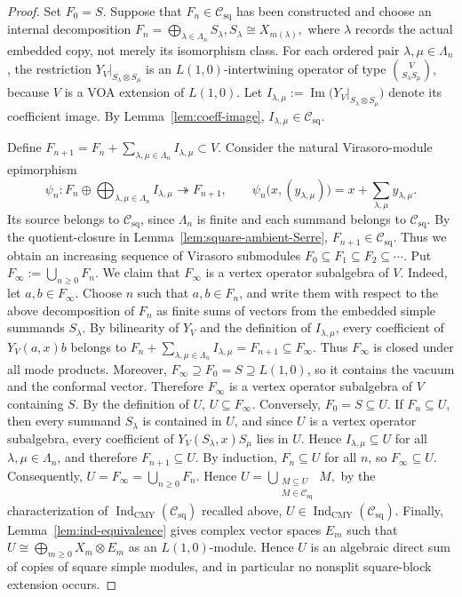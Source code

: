 \documentclass[10pt,a4paper]{amsart}
\numberwithin{equation}{section} \newtheorem{thm}{Theorem}[section] \newtheorem{lem}[thm]{Lemma} \newtheorem{ex}[thm]{Example} \newtheorem{prop}[thm]{Proposition} \newtheorem{cor}[thm]{Corollary} \newtheorem{defi}[thm]{Definition} \newtheorem{rmk}[thm]{Remark} \newtheorem{notation}[thm]{Notation}
\newcommand{\Csq}{\mathcal C_{\mathrm{sq}}}
\newcommand{\IndCMY}{\operatorname{Ind}_{\mathrm{CMY}}}
\begin{document}
\begin{proof}
Set \(F_0=S\). Suppose that \(F_n\in\Csq\) has been constructed and choose an internal decomposition \(F_n=\bigoplus_{\lambda\in\Lambda_n}S_\lambda,S_\lambda\cong X_{m(\lambda)},\) where $\lambda$ records the actual embedded copy, not merely its isomorphism class. For each ordered pair \(\lambda,\mu\in\Lambda_n\), the restriction \(Y_V|_{S_\lambda\otimes S_\mu}\) is an $L(1,0)$-intertwining operator of type \(\binom{V}{S_\lambda S_\mu},\) because $V$ is a VOA extension of $L(1,0)$. Let \(I_{\lambda,\mu}:=\operatorname{Im}\bigl(Y_V|_{S_\lambda\otimes S_\mu}\bigr)\) denote its coefficient image. By Lemma~\ref{lem:coeff-image}, \(I_{\lambda,\mu}\in\Csq\).

Define \(F_{n+1}=F_n+\sum_{\lambda,\mu\in\Lambda_n}I_{\lambda,\mu}\subset V.\) Consider the natural Virasoro-module epimorphism
\[
\psi_n:
F_n\oplus
\bigoplus_{\lambda,\mu\in\Lambda_n}I_{\lambda,\mu}
\twoheadrightarrow F_{n+1},
\qquad
\psi_n\bigl(x,(y_{\lambda,\mu})\bigr)
=
x+\sum_{\lambda,\mu}y_{\lambda,\mu}.
\]
Its source belongs to $\Csq$, since $\Lambda_n$ is finite and each summand belongs to $\Csq$. By the quotient-closure in Lemma~\ref{lem:square-ambient-Serre}, \(F_{n+1}\in\Csq\). Thus we obtain an increasing sequence of Virasoro submodules \(F_0\subseteq F_1\subseteq F_2\subseteq\cdots.\) Put \(F_\infty:=\bigcup_{n\ge0}F_n.\) We claim that $F_\infty$ is a vertex operator subalgebra of $V$. Indeed, let \(a,b\in F_\infty\). Choose \(n\) such that \(a,b\in F_n\), and write them with respect to the above decomposition of \(F_n\) as finite sums of vectors from the embedded simple summands \(S_\lambda\). By bilinearity of $Y_V$ and the definition of \(I_{\lambda,\mu}\), every coefficient of \(Y_V(a,x)b\) belongs to \(F_n+\sum_{\lambda,\mu\in\Lambda_n}I_{\lambda,\mu}=F_{n+1}\subseteq F_\infty.\) Thus $F_\infty$ is closed under all mode products. Moreover, \(F_\infty\supseteq F_0=S\supseteq L(1,0)\), so it contains the vacuum and the conformal vector. Therefore $F_\infty$ is a vertex operator subalgebra of $V$ containing $S$. By the definition of $U$, \(U\subseteq F_\infty.\) Conversely, \(F_0=S\subseteq U\). If \(F_n\subseteq U\), then every summand \(S_\lambda\) is contained in $U$, and since $U$ is a vertex operator subalgebra, every coefficient of \(Y_V(S_\lambda,x)S_\mu\) lies in $U$. Hence \(I_{\lambda,\mu}\subseteq U\) for all \(\lambda,\mu\in\Lambda_n\), and therefore \(F_{n+1}\subseteq U\). By induction, \(F_n\subseteq U\) for all \(n\), so \(F_\infty\subseteq U.\) Consequently, \(U=F_\infty=\bigcup_{n\ge0}F_n.\) Hence \(U=\bigcup_{\substack{M\subseteq U\\M\in\Csq}}M,\) by the characterization of \(\IndCMY(\Csq)\) recalled above, \(U\in\IndCMY(\Csq)\). Finally, Lemma~\ref{lem:ind-equivalence} gives complex vector spaces \(E_m\) such that \(U\cong\bigoplus_{m\ge0}X_m\otimes E_m\) as an $L(1,0)$-module. Hence $U$ is an algebraic direct sum of copies of square simple modules, and in particular no nonsplit square-block extension occurs.
\end{proof}
\end{document}
